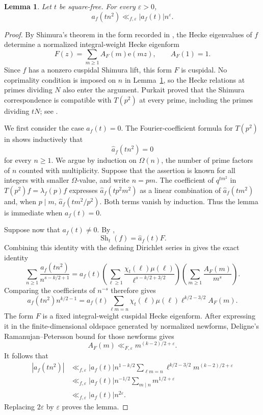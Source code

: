 \documentclass[11pt]{amsart}
\newtheorem{lemma}[theorem]{Lemma}
\theoremstyle{remark}
\newcommand{\e}{\mathrm{e}}
\begin{document}
\begin{lemma}\label{lem:square-index}
Let $t$ be square-free. For every $\varepsilon>0$,
\[
a_f(tn^2)\ll_{f,\varepsilon}|a_f(t)|n^\varepsilon.
\]
\end{lemma}

\begin{proof}
By Shimura's theorem in the form recorded in
\cite[Theorem~2(iv)]{PurkaitDecomposition}, the Hecke eigenvalues of $f$ determine a normalized integral-weight Hecke
eigenform
\[
F(z)=\sum_{m\ge1}A_F(m)\e(mz),\qquad A_F(1)=1.
\]
Since $f$ has a nonzero cuspidal Shimura lift, this form $F$ is cuspidal.
No coprimality condition is imposed on $n$ in
Lemma~\ref{lem:square-index}, so the Hecke relations at primes dividing
$N$ also enter the argument. Purkait proved that the Shimura
correspondence is compatible with $T(p^2)$ at every prime, including the
primes dividing $tN$; see \cite[Theorem~1.2]{PurkaitHecke}.

We first consider the case $a_f(t)=0$. The Fourier-coefficient formula
for $T(p^2)$ in \cite[Theorem~2.1]{PurkaitHecke} shows inductively that
\[
\widehat a_f(tn^2)=0
\]
for every $n\ge1$. We argue by induction on $\Omega(n)$, the number of prime factors of $n$
counted with multiplicity. Suppose that the assertion is known for all
integers with smaller $\Omega$-value, and write $n=pm$. The coefficient of
$q^{tm^2}$ in $T(p^2)f=\lambda_f(p)f$ expresses
$\widehat a_f(tp^2m^2)$ as a linear combination of
$\widehat a_f(tm^2)$ and, when $p\mid m$,
$\widehat a_f(tm^2/p^2)$. Both terms vanish by induction. Thus the lemma
is immediate when $a_f(t)=0$.

Suppose now that $a_f(t)\ne0$. By
\cite[Theorem~2(iv)]{PurkaitDecomposition},
\[
\operatorname{Sh}_t(f)=\widehat a_f(t)F.
\]
Combining this identity with the defining Dirichlet series in
\cite[Theorem~2]{PurkaitDecomposition} gives the exact identity
\[
\sum_{n\ge1}\frac{a_f(tn^2)}{n^{s-k/2+1}}
=a_f(t)
\left(\sum_{\ell\ge1}\frac{\chi_t(\ell)\mu(\ell)}
{\ell^{s-k/2+3/2}}\right)
\left(\sum_{m\ge1}\frac{A_F(m)}{m^s}\right).
\tag{3.1}
\]
Comparing the
coefficients of $n^{-s}$ therefore gives
\[
a_f(tn^2)n^{k/2-1}
=a_f(t)\sum_{\ell m=n}\chi_t(\ell)\mu(\ell)
\ell^{k/2-3/2}A_F(m).
\]
The form $F$ is a fixed integral-weight cuspidal Hecke eigenform. After
expressing it in the finite-dimensional oldspace generated by normalized
newforms, Deligne's Ramanujan--Petersson bound for those newforms
\cite{Deligne} gives
\[
A_F(m)\ll_{F,\varepsilon}m^{(k-2)/2+\varepsilon}.
\]
It follows that
\begin{align*}
|a_f(tn^2)|
&\ll_{f,\varepsilon}|a_f(t)|n^{1-k/2}
  \sum_{\ell m=n}\ell^{k/2-3/2}m^{(k-2)/2+\varepsilon}\\
&\ll_{f,\varepsilon}|a_f(t)|n^{-1/2}
  \sum_{m\mid n}m^{1/2+\varepsilon}\\
&\ll_{f,\varepsilon}|a_f(t)|n^{2\varepsilon}.
\end{align*}
Replacing $2\varepsilon$ by $\varepsilon$ proves the lemma.
\end{proof}
\end{document}
